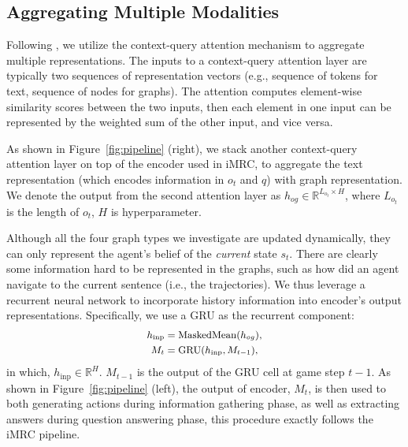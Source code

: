 \documentclass[11pt]{article}
\newcommand{\imrc}{iMRC\xspace}
\begin{document}
\subsection{Aggregating Multiple Modalities}
\label{subsection:aggregate_modalities}

Following \citet{yuan2020imrc}, we utilize the context-query attention mechanism \citep{yu18qanet} to aggregate multiple representations. 
The inputs to a context-query attention layer are typically two sequences of representation vectors (e.g., sequence of tokens for text, sequence of nodes for graphs).
The attention computes element-wise similarity scores between the two inputs, then each element in one input can be represented by the weighted sum of the other input, and vice versa.

As shown in Figure~\ref{fig:pipeline} (right), we stack another context-query attention layer on top of the encoder used in \imrc, to aggregate the text representation (which encodes information in $o_t$ and $q$) with graph representation.
We denote the output from the second attention layer as $h_{og} \in \mathbb{R}^{L_{o_t} \times H}$, where $L_{o_t}$ is the length of $o_t$, $H$ is hyperparameter.

Although all the four graph types we investigate are updated dynamically, they can only represent the agent's belief of the \emph{current} state $s_t$.
There are clearly some information hard to be represented in the graphs, such as how did an agent navigate to the current sentence (i.e., the trajectories).
We thus leverage a recurrent neural network to incorporate history information into encoder's output representations.
Specifically, we use a GRU \citep{cho2014gru} as the recurrent component:
\begin{equation}
\small
\begin{aligned}
    h_{\text{inp}} &= \textrm{MaskedMean}(h_{og}),\\
    M_t &= \mathrm{GRU}(h_{\text{inp}}, M_{t-1}),
\end{aligned}
\end{equation}
in which, $h_{\text{inp}} \in \mathbb{R}^{H}$. $M_{t-1}$ is the output of the GRU cell at game step $t-1$.
As shown in Figure~\ref{fig:pipeline} (left), the output of encoder, $M_t$, is then used to both generating actions during information gathering phase, as well as extracting answers during question answering phase, this procedure exactly follows the \imrc pipeline.
\end{document}
